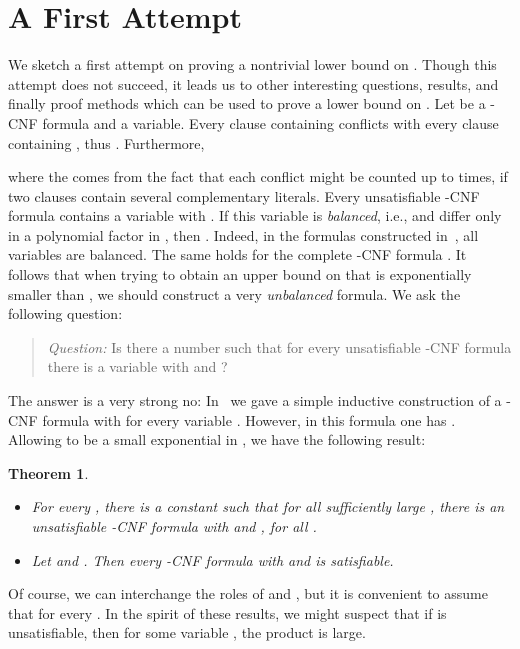 \documentclass[a4paper, 11pt]{article}
\newtheorem{theorem}{Theorem}\newtheorem{proposition}[theorem]{Proposition}
\begin{document}
\section{A First Attempt} \label{section-first-attempt}

We sketch a first attempt on proving a nontrivial lower bound on
. Though this attempt does not succeed, it leads us to other
interesting questions, results, and finally proof methods which can be
used to prove a lower bound on .  Let  be a -CNF formula and
 a variable. Every clause containing  conflicts with every
clause containing , thus . Furthermore,

where the  comes from the fact that each conflict might
be counted up to  times, if two clauses contain several
complementary literals.  Every unsatisfiable -CNF formula 
contains a variable  with .  If this
variable is {\em balanced}, i.e.,  and 
differ only in a polynomial factor in , then . Indeed, in the formulas constructed
in~\cite{Gebauer2009}, all variables are balanced. The same holds for
the complete -CNF formula .  It follows that when
trying to obtain an upper bound on  that is exponentially
smaller than , we should construct a very {\em unbalanced}
formula.  We ask the following question:

\begin{quotation}
  {\em Question:} Is there a number  such that for every
  unsatisfiable -CNF formula  there is a variable with
   and ?
\end{quotation}

The answer is a very
strong no:
In~\cite{SZ2008} we gave a simple inductive construction of a -CNF
formula  with  for every variable .
However, in this formula one has .
Allowing  to be a small exponential in , we have
the following result:

\begin{theorem}
 
  \begin{itemize}
  \item[(i)] For every ,  there is a
    constant  such that for all sufficiently large , there is an
    unsatisfiable -CNF formula  with  and , for all .
  \item[(ii)] Let  and . Then every -CNF formula  with
     and 
     is
    satisfiable.
  \end{itemize}
  \label{tradeoff-exponential}
\end{theorem}

Of course, we can interchange the
roles of  and , but it is convenient to assume that
 for every .
In the spirit of these
results, we might suspect that if  is unsatisfiable, then for some
variable , the product   is large.
\end{document}
